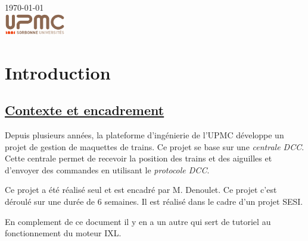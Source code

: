 \begin{titlepage}
{\large \today}\\[2cm] %


\includegraphics[width=0.2\textwidth]{logo.png}


\vfill %

\end{titlepage}




\section{Introduction}
\label{sec:introduction}

\subsection{\underline{Contexte et encadrement}}

Depuis plusieurs ann\'ees, la plateforme d'ingénierie de l'UPMC d\'eveloppe un projet de
gestion de maquettes de trains. Ce projet se base sur une
\emph{centrale DCC}. Cette centrale permet de recevoir la position des
trains et des aiguilles et d'envoyer des commandes en utilisant le
\emph{protocole DCC}.

Ce projet a été r\'ealis\'e seul et est encadr\'e par M. Denoulet. Ce projet c'est d\'eroulé sur une dur\'ee de 6 semaines.
Il est r\'ealis\'e dans le cadre d'un projet SESI.

En complement de ce document il y en a un autre \cite{interface} qui sert de
tutoriel au fonctionnement du moteur IXL. 

